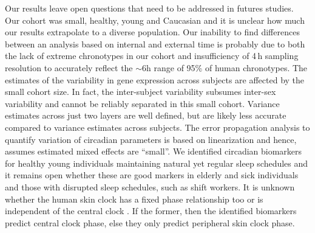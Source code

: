 Our results leave open questions that need to be addressed in futures studies. Our cohort was small, healthy, young and Caucasian and it is unclear how much our results extrapolate to a diverse population. Our inability to find differences between an analysis based on internal and external time is probably due to both the lack of extreme chronotypes in our cohort and insufficiency of 4\,h sampling resolution to accurately reflect the $\sim$6h range of 95\% of human chronotypes. The estimates of the variability in gene expression across subjects are affected by the small cohort size. In fact, the inter-subject variability subsumes inter-sex variability and cannot be reliably separated in this small cohort. Variance estimates across just two layers are well defined, but are likely less accurate compared to variance estimates across subjects. The error propagation analysis to quantify variation of circadian parameters is based on linearization and hence, assumes estimated mixed effects are ``small''. We identified circadian biomarkers for healthy young individuals maintaining natural yet regular sleep schedules and it remains open whether these are good markers in elderly and sick individuals and those with disrupted sleep schedules, such as shift workers. It is unknown whether the human skin clock has a fixed phase relationship too or is independent of the central clock \cite{Welz2019}. If the former, then the identified biomarkers predict central clock phase, else they only predict peripheral skin clock phase.

